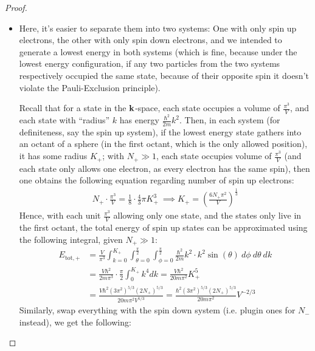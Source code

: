 \documentclass{article}
\begin{document}
\begin{proof}

    \hfil

    \begin{itemize}
        \item[(a)] Here, it's easier to separate them into two systems: One with only spin up electrons, the other with only spin down electrons, and we intended to generate a lowest energy in both systems (which is fine, because under the lowest energy configuration, if any two particles from the two systems respectively occupied the same state, because of their opposite spin it doesn't violate the Pauli-Exclusion principle).
        
        \hfil

        Recall that for a state in the $\mathbf{k}$-space, each state occupies a volume of $\frac{\pi^3}{V}$, and each state with ``radius'' $k$ has energy $\frac{\hbar^2}{2m}k^2$. Then, in each system (for definiteness, say the spin up system), if the lowest energy state gathers into an octant of a sphere (in the first octant, which is the only allowed position), it has some radius $K_+$; with $N_+ \gg 1$, each state occupies volume of $\frac{\pi^3}{V}$ (and each state only allows one electron, as every electron has the same spin), then one obtains the following equation regarding number of spin up electrons:
        \begin{align}
            N_+\cdot\frac{\pi^3}{V} = \frac{1}{8}\cdot\frac{4}{3}\pi K_+^3 \ \implies K_+ = \left(\frac{6 N_+ \pi^2}{V}\right)^\frac{1}{3}
        \end{align}
        Hence, with each unit $\frac{\pi^3}{V}$ allowing only one state, and the states only live in the first octant, the total energy of spin up states can be approximated using the following integral, given $N_+\gg 1$:
        \begin{align}
            E_{\text{tot},+} &= \frac{V}{\pi^3}\int_{k=0}^{K_+}\int_{\theta=0}^{\frac{\pi}{2}}\int_{\phi=0}^{\frac{\pi}{2}}\frac{\hbar^2}{2m}k^2 \cdot k^2\sin(\theta)\ d\phi\ d\theta\ dk\\
            &= \frac{V\hbar^2}{2m\pi^3}\cdot\frac{\pi}{2}\int_{0}^{K_+}k^4 dk= \frac{V\hbar^2}{20m\pi^2}K_+^5\\
            &= \frac{V\hbar^2 (3\pi^2)^{5/3}(2N_+)^{5/3}}{20m\pi^2 V^{5/3}} = \frac{\hbar^2(3\pi^2)^{5/3}(2N_+)^{5/3}}{20m\pi^2}V^{-2/3}
        \end{align}
        Similarly, swap everything with the spin down system (i.e. plugin ones for $N_-$ instead), we get the following:

\end{itemize}
\end{proof}
\end{document}
